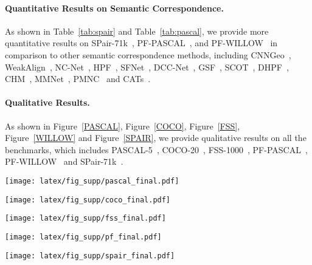\paragraph{Quantitative Results on Semantic Correspondence.}
As shown in Table~\ref{tab:spair} and Table~\ref{tab:pascal}, we provide more quantitative results on  SPair-71k~\cite{min2019spair}, PF-PASCAL~\cite{ham2017proposal}, and PF-WILLOW~\cite{ham2016proposal} in comparison to other semantic correspondence methods, including CNNGeo~\cite{rocco2017convolutional}, WeakAlign~\cite{rocco2018end}, NC-Net~\cite{Rocco18b}, HPF~\cite{min2019hyperpixel}, SFNet~\cite{lee2019sfnet}, DCC-Net~\cite{huang2019dynamic}, GSF~\cite{jeon2020guided}, SCOT~\cite{liu2020semantic}, DHPF~\cite{min2020learning}, CHM~\cite{min2021convolutional}, MMNet~\cite{zhao2021multi}, PMNC~\cite{Lee_2021_CVPR} and CATs~\cite{cho2021semantic}. \vspace{-10pt}

\paragraph{Qualitative Results.}
As shown in Figure~\ref{PASCAL}, Figure~\ref{COCO}, Figure~\ref{FSS}, Figure~\ref{WILLOW} and Figure~\ref{SPAIR}, we provide qualitative results on all the benchmarks, which includes PASCAL-5~\cite{shaban2017one}, COCO-20~\cite{lin2014microsoft}, FSS-1000~\cite{li2020fss}, PF-PASCAL~\cite{ham2017proposal}, PF-WILLOW~\cite{ham2016proposal} and SPair-71k~\cite{min2019spair}.
\newpage
\begin{figure*}[t]
\centering
\texttt{[image: latex/fig\_supp/pascal\_final.pdf]}
\caption{\textbf{Qualitative results on PASCAL-5~\cite{shaban2017one}.}   }
\label{PASCAL}
\end{figure*}
\newpage
\begin{figure*}[t]
\centering
\texttt{[image: latex/fig\_supp/coco\_final.pdf]}
\caption{\textbf{Qualitative results on COCO-20~\cite{lin2014microsoft}.}   }
\label{COCO}
\end{figure*}
\newpage
\begin{figure*}[t]
\centering
\texttt{[image: latex/fig\_supp/fss\_final.pdf]}
\caption{\textbf{Qualitative results on FSS-1000~\cite{li2020fss}.}   }
\label{FSS}
\end{figure*}
\newpage
\begin{figure*}[t]
\centering
\texttt{[image: latex/fig\_supp/pf\_final.pdf]}
\caption{\textbf{Qualitative results on PF-PASCAL~\cite{ham2017proposal} (left) and PF-WILLOW~\cite{ham2016proposal} (right). }   }
\label{WILLOW}
\end{figure*}
\newpage
\begin{figure*}[t]
\centering
\texttt{[image: latex/fig\_supp/spair\_final.pdf]}
\caption{\textbf{Qualitative results on SPair-71k~\cite{min2019spair}.}   }
\label{SPAIR}
\end{figure*}
\clearpage
\newpage
